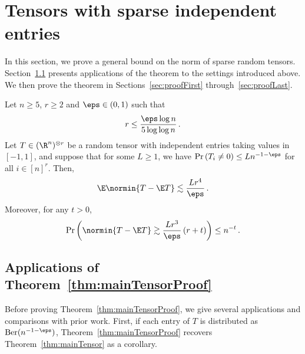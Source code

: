 \documentclass[11pt,a4paper]{article}
\begin{document}
\section{Tensors with sparse independent entries}
\label{sec:mainProof}

In this section, we prove a general bound on the norm of sparse random tensors. Section~\ref{sec:applis} presents applications of the theorem to the settings introduced above. We then prove the theorem in Sections~\ref{sec:proofFirst} through~\ref{sec:proofLast}.

\begin{theorem}\label{thm:mainTensorProof}
    Let $n\ge 5$, $r\ge 2$ and $\eps\in (0,1)$ such that
    \begin{equation}
        r\le \frac {\eps \log n}{5\log \log n}\,.\label{eq:rAssumption}
    \end{equation}
    Let $T\in (\R^n)^{\otimes r}$ be a random tensor with independent entries taking values in $[-1,1]$, and suppose that for some
    $L\geq 1$, we have $\Pr\left(T_i\neq 0\right)\le Ln^{-1-\eps}$ for all $i\in [n]^r$.
    Then,
    \[
        \E \normin{T - \E T} \lesssim \frac {Lr^4} \eps\,.
    \]
    Moreover, for any $t>0$,
    \[
        \Pr\left(\normin{T - \E T}\gtrsim \frac {Lr^3} \eps\left(r + t\right)\right)\le n^{-t}\,.
    \]
\end{theorem}

\subsection{Applications \texorpdfstring{of Theorem~\ref{thm:mainTensorProof}}{}}
\label{sec:applis}

Before proving Theorem~\ref{thm:mainTensorProof}, we give several applications and comparisons with prior work.
First, if each entry of $T$ is distributed as $\textnormal{Ber}(n^{-1-\eps})$, Theorem~\ref{thm:mainTensorProof} recovers Theorem~\ref{thm:mainTensor} as a corollary. 
\end{document}
